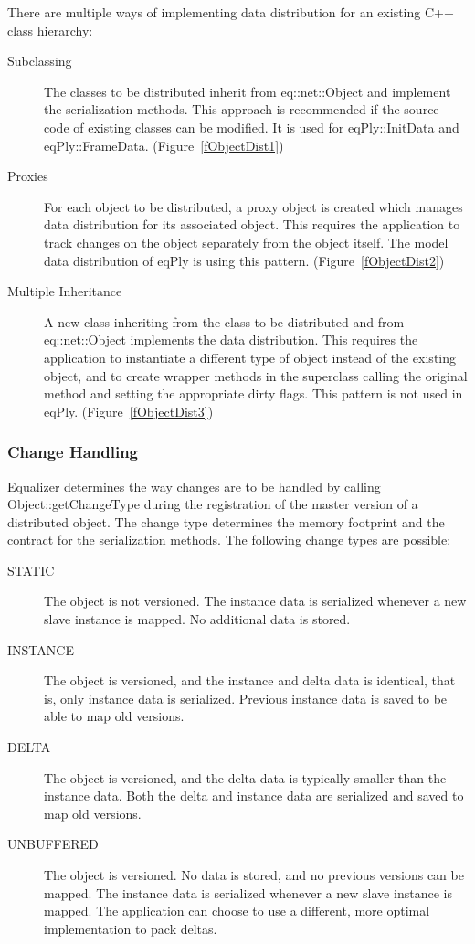 \documentclass[10pt,a4]{scrartcl}
\newcommand{\fig}[1]{Figure~\ref{#1}}
\begin{document}
There are multiple ways of implementing data distribution for an
existing C++ class hierarchy:
\begin{description}
\item[Subclassing] The classes to be distributed inherit from
  \textsf{eq::net::Object} and implement the serialization methods. This
  approach is recommended if the source code of existing classes can be
  modified. It is used for \textsf{eqPly::InitData} and
  \textsf{eqPly::FrameData}. (\fig{fObjectDist1})
\item[Proxies] For each object to be distributed, a proxy object is
  created which manages data distribution for its associated
  object. This requires the application to track changes on the object
  separately from the object itself. The model data distribution of
  eqPly is using this pattern. (\fig{fObjectDist2})
\item[Multiple Inheritance] A new class inheriting from the class to be
  distributed and from \textsf{eq::net::Object} implements the data
  distribution. This requires the application to instantiate a different
  type of object instead of the existing object, and to create wrapper
  methods in the superclass calling the original method and setting the
  appropriate dirty flags. This pattern is not used in
  eqPly. (\fig{fObjectDist3})
\end{description}

\subsubsection{Change Handling}

Equalizer determines the way changes are to be handled by calling
\textsf{Object::get\-Change\-Type} during the registration of the master
version of a distributed object. The change type determines the memory
footprint and the contract for the serialization methods. The following
change types are possible:

\begin{description}
  \item[STATIC] The object is not versioned. The instance data is
    serialized whenever a new slave instance is mapped. No additional
    data is stored.
  \item[INSTANCE] The object is versioned, and the instance and delta
    data is identical, that is, only instance data is
    serialized. Previous instance data is saved to be able to map old
    versions.
  \item[DELTA] The object is versioned, and the delta data is typically
    smaller than the instance data. Both the delta and instance data are
    serialized and saved to map old versions.
  \item[UNBUFFERED] The object is versioned. No data is stored, and no
    previous versions can be mapped. The instance data is serialized
    whenever a new slave instance is mapped. The application can choose
    to use a different, more optimal implementation to pack deltas.
\end{description}
\end{document}
